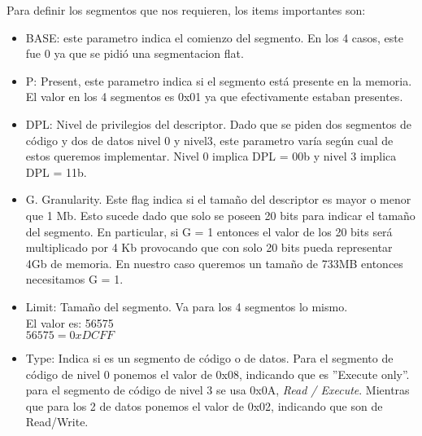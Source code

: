 Para definir los segmentos que nos requieren, los items importantes son:\\
\begin{itemize}
 \item BASE: este parametro indica el comienzo del segmento. En los 4 casos, este fue 0 ya que se pidió una segmentacion flat.
 \item P: Present, este parametro indica si el segmento est\'a presente en la memoria. El valor en los 4 segmentos es 0x01 ya que efectivamente estaban presentes.
 \item DPL: Nivel de privilegios del descriptor. Dado que se piden dos segmentos de código y dos de datos nivel 0 y nivel3, este 
parametro var\'ia seg\'un cual de estos queremos implementar. Nivel 0 implica DPL = 00b y nivel 3 implica DPL = 11b.
 \item G. Granularity. Este flag indica si el tamaño del descriptor es mayor o menor que 1 Mb. Esto sucede dado que solo se poseen 20 bits para 
indicar el tamaño del segmento. En particular, si G = 1 entonces el valor de los 20 bits ser\'a multiplicado por 4 Kb provocando que con 
 solo 20 bits pueda representar 4Gb de memoria. En nuestro caso queremos un tamaño de 733MB entonces necesitamos G = 1.
 \item Limit: Tamaño del segmento. Va para los 4 segmentos lo mismo.\\
 \indent El valor es: 56575\\
  \indent $56575 = 0xDCFF$
 \item Type: Indica si es un segmento de c\'odigo o de datos. Para el segmento de c\'odigo de nivel 0 ponemos el valor de 0x08, indicando 
que es ''Execute only''. para el segmento de c\'odigo de nivel 3 se usa 0x0A, \emph{Read / Execute}. Mientras que para los 2 de datos 
ponemos el valor de 0x02, indicando que son de Read/Write.
\end{itemize}

